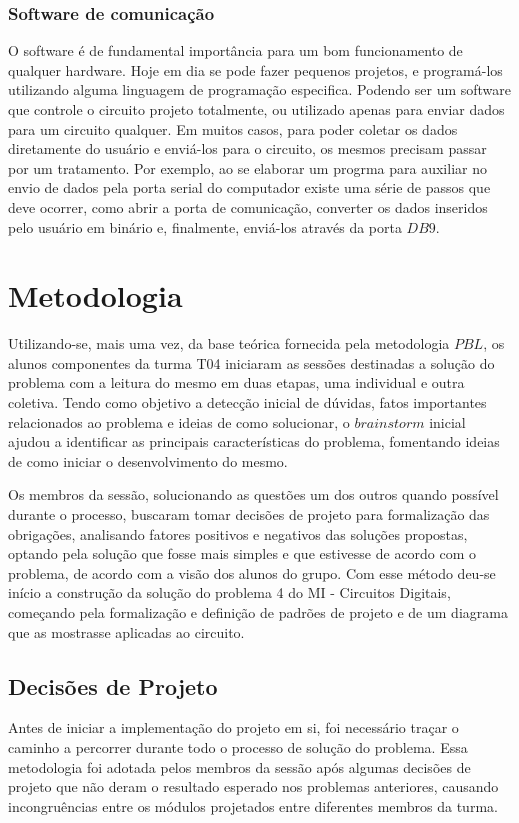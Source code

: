 \documentclass[12pt]{article}
\begin{document}
\subsubsection{Software de comunicação}
O software é de fundamental importância para um bom funcionamento de qualquer hardware. Hoje em dia se pode fazer pequenos projetos, e programá-los utilizando alguma linguagem de programação especifica. Podendo ser um software que controle o circuito projeto totalmente, ou utilizado apenas para enviar dados para um circuito qualquer. Em muitos casos, para poder coletar os dados diretamente do usuário e enviá-los para o circuito, os mesmos precisam passar por um tratamento. Por exemplo, ao se elaborar um progrma para auxiliar no envio de dados pela porta serial do computador existe uma série de passos que deve ocorrer, como abrir a porta de comunicação, converter os dados inseridos pelo usuário em binário e, finalmente, enviá-los através da porta $DB9$.

\section{Metodologia}
Utilizando-se, mais uma vez, da base teórica fornecida pela metodologia $PBL$, os alunos componentes da turma T04 iniciaram as sessões destinadas a solução do problema com a leitura do mesmo em duas etapas, uma individual e outra coletiva. Tendo como objetivo a detecção inicial de dúvidas, fatos importantes relacionados ao problema e ideias de como solucionar, o $brainstorm$ inicial ajudou a identificar as principais características do problema, fomentando ideias de como iniciar o desenvolvimento do mesmo.


Os membros da sessão, solucionando as questões um dos outros quando possível durante o processo, buscaram tomar decisões de projeto para formalização das obrigações, analisando fatores positivos e negativos das soluções propostas, optando pela solução que fosse mais simples e que estivesse de acordo com o problema, de acordo com a visão dos alunos do grupo. Com esse método deu-se início a construção da solução do problema 4 do MI - Circuitos Digitais, começando pela formalização e definição de padrões de projeto e de um diagrama que as mostrasse aplicadas ao circuito.

\subsection{Decisões de Projeto}
Antes de iniciar a implementação do projeto em si, foi necessário traçar o caminho a percorrer durante todo o processo de solução do problema. Essa metodologia foi adotada pelos membros da sessão após algumas decisões de projeto que não deram o resultado esperado nos problemas anteriores, causando incongruências entre os módulos projetados entre diferentes membros da turma. 
\end{document}
